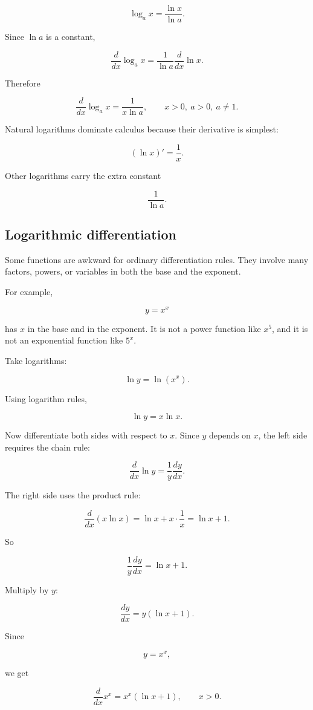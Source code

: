 \[
\log_a x=\frac{\ln x}{\ln a}.
\]

Since \(\ln a\) is a constant,

\[
\frac{d}{dx}\log_a x
=
\frac1{\ln a}\frac{d}{dx}\ln x.
\]

Therefore

\[
\boxed{
\frac{d}{dx}\log_a x=\frac1{x\ln a},
\qquad x>0,\ a>0,\ a\neq1.
}
\]

Natural logarithms dominate calculus because their derivative is simplest:

\[
(\ln x)'=\frac1x.
\]

Other logarithms carry the extra constant

\[
\frac1{\ln a}.
\]

\subsection{Logarithmic differentiation}
\label{subsec:logarithmic-differentiation}

Some functions are awkward for ordinary differentiation rules.  They involve many factors, powers, or variables in both the base and the exponent.

For example,

\[
y=x^x
\]

has \(x\) in the base and in the exponent.  It is not a power function like \(x^5\), and it is not an exponential function like \(5^x\).

Take logarithms:

\[
\ln y=\ln(x^x).
\]

Using logarithm rules,

\[
\ln y=x\ln x.
\]

Now differentiate both sides with respect to \(x\).  Since \(y\) depends on \(x\), the left side requires the chain rule:

\[
\frac{d}{dx}\ln y=\frac1y\frac{dy}{dx}.
\]

The right side uses the product rule:

\[
\frac{d}{dx}(x\ln x)=\ln x+x\cdot\frac1x=\ln x+1.
\]

So

\[
\frac1y\frac{dy}{dx}=\ln x+1.
\]

Multiply by \(y\):

\[
\frac{dy}{dx}=y(\ln x+1).
\]

Since

\[
y=x^x,
\]

we get

\[
\boxed{
\frac{d}{dx}x^x=x^x(\ln x+1),
\qquad x>0.
}
\]

